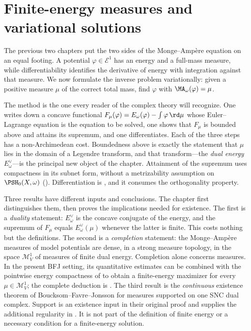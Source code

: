 \chapter{Finite-energy measures and variational solutions}
\label{chap:bfj-finite-energy-measures}

The previous two chapters put the two sides of the Monge--Amp\`ere equation
on an equal footing.  A potential $\varphi\in\mathcal E^1$ has an energy
and a full-mass measure, while differentiability identifies the derivative of
energy with integration against that measure.  We now formulate the inverse
problem variationally: given a positive measure $\mu$ of the correct total
mass, find $\varphi$ with $\MA_\omega(\varphi)=\mu$.

The method is the one every reader of the complex theory will recognize.
One writes down a concave functional
$F_\mu(\varphi)=E_\omega(\varphi)-\int\varphi\,\rd\mu$ whose
Euler--Lagrange equation is the equation to be solved, one shows that
$F_\mu$ is bounded above and attains its supremum, and one differentiates.
Each of the three steps has a non-Archimedean cost.  Boundedness above is
exactly the statement that $\mu$ lies in the domain of a Legendre
transform, and that transform---the \emph{dual energy}
$E^\vee_\omega$---is the principal new object of the chapter.  Attainment
of the supremum uses compactness in its subnet form, without a
metrizability assumption on $\PSH_0(X,\omega)$
().  Differentiation is
, and it consumes the orthogonality property.

Three results have different inputs and conclusions.  The chapter first
distinguishes them, then proves the implications needed for existence.
The first is a \emph{duality} statement: $E^\vee_\omega$ is
the concave conjugate of the energy, and the supremum of $F_\mu$ equals
$E^\vee_\omega(\mu)$ whenever the latter is finite.  This costs nothing
but the definitions.  The second is a \emph{completion} statement: the
Monge--Amp\`ere measures of model potentials are dense, in a strong measure
topology, in the space $\mathcal M^1_V$ of measures of finite dual energy.
Completion alone concerns measures.  In the present BFJ setting,
its quantitative estimates can be combined with the pointwise energy
compactness of  to obtain a finite-energy maximizer
for every $\mu\in\mathcal M^1_V$; the complete deduction is
.  The third result is the
\emph{continuous} existence theorem of Boucksom--Favre--Jonsson for
measures supported on one SNC dual complex.  Support is an existence
input in their original proof and supplies the additional regularity in
.  It is not part of the definition of finite
energy or a necessary condition for a finite-energy solution.

